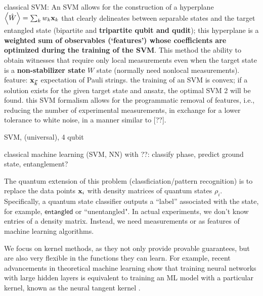 \documentclass[
aps,
pra,
floatfix,
]{revtex4-2}
\theoremstyle{plain}
\theoremstyle{definition}
\newcommand{\ew}{\hat{W}}
\newcommand{\entangled}{\textsf{entangled}}
\newcommand{\dm}{\rho}
\begin{document}


classical SVM: An SVM allows for the construction of a hyperplane $\expval{\ew}=\sum_k w_k \vbx_{k}$ that clearly delineates between separable states and the target entangled state (bipartite and \textbf{tripartite qubit and qudit}); this hyperplane is a \textbf{weighted sum of observables (`features') whose coefficients are optimized during the training of the SVM}.
This method the ability to obtain witnesses that require only local measurements even when the target state is a \textbf{non-stabilizer state} $W$ state (normally need nonlocal measurements).
feature: $\vb{x}_{\vec{k}}$ expectation of Pauli strings.
the training of an SVM is convex; if a solution exists for the given target state and ansatz, the optimal SVM 2 will be found.
this SVM formalism allows for the programmatic removal of features, i.e., reducing the number of experimental measurements, in exchange for a lower tolerance to white noise, in a manner similar to [??].

SVM, (universal), 4 qubit \cite{vintskevichClassificationFourqubitEntangled2022}

classical machine learning (SVM, NN) with  \cite{huangProvablyEfficientMachine2021}??: classify phase, predict ground state, entanglement?

The quantum extension of this problem (classficiation/pattern recognition) is to replace the data points $\vb{x}_i$ with density matrices of quantum states $\dm_i$. 
Specifically, a quantum state classifier outputs a “label” associated with the state, for example, $\entangled$ or ``unentangled".
In actual experiments, we don't know entries of a density matrix.
Instead, we need measurements or  as features of machine learning algorithms.

We focus on kernel methods, as they not only provide provable guarantees, but are also very flexible in the functions they can learn. For example, recent advancements in theoretical machine learning show that training neural networks with large hidden layers is equivalent to training an ML model with a particular kernel, known as the neural tangent kernel \cite{jacotNeuralTangentKernel2020}.
\end{document}
